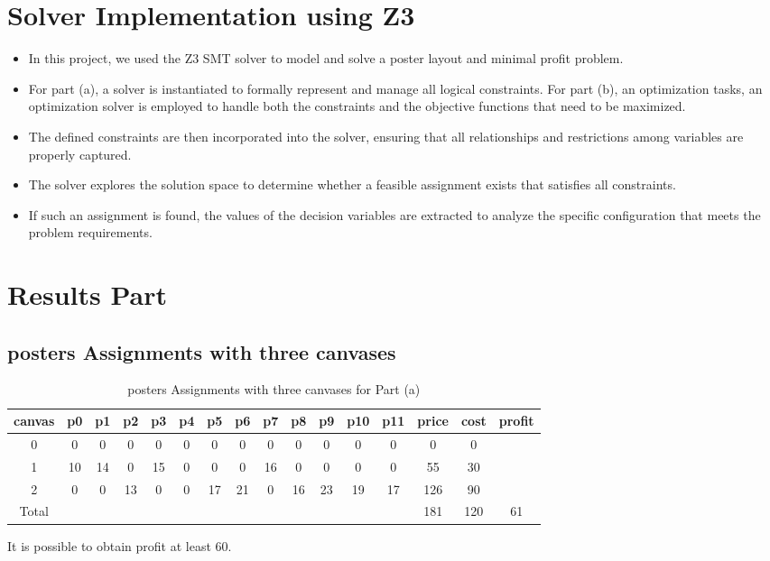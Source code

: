 \documentclass{article}
\begin{document}
\section{Solver Implementation using Z3}

\begin{itemize}
    \item In this project, we used the Z3 SMT solver to model and solve a poster layout and minimal profit problem. 
    \item For part (a), a solver is instantiated to formally represent and manage all logical constraints. For part (b), an optimization tasks, an optimization solver is employed to handle both the constraints and the objective functions that need to be maximized.
    \item The defined constraints are then incorporated into the solver, ensuring that all relationships and restrictions among variables are properly captured.
    \item The solver explores the solution space to determine whether a feasible assignment exists that satisfies all constraints.
    \item If such an assignment is found, the values of the decision variables are extracted to analyze the specific configuration that meets the problem requirements.
\end{itemize}

\section{Results Part}

\subsection{posters Assignments with three canvases}

\begin{table}[H]
\centering
\caption{posters Assignments with three canvases for Part (a)}
\small
\begin{tabular}{c|cccccccccccc|c|c|c}
\toprule
canvas & p0 & p1 & p2 & p3 & p4  & p5 & p6 & p7 & p8 & p9 & p10 & p11 & price & cost & profit\\
\midrule
0 & 0 & 0 & 0 & 0 & 0 & 0 & 0 & 0 & 0 & 0 & 0 & 0 & 0 & 0 &\\
1 & 10 & 14 & 0 & 15 & 0 & 0 & 0 & 16 & 0 & 0 & 0 & 0 & 55 & 30 &\\
2 & 0 & 0 & 13 & 0 & 0 & 17 & 21 & 0 & 16 & 23 & 19 & 17 & 126 & 90 &\\
\midrule
Total & & & & & & & & & & & & & 181 & 120 & 61\\
\bottomrule
\end{tabular}
\end{table}
It is possible to obtain profit at least 60.
\end{document}
